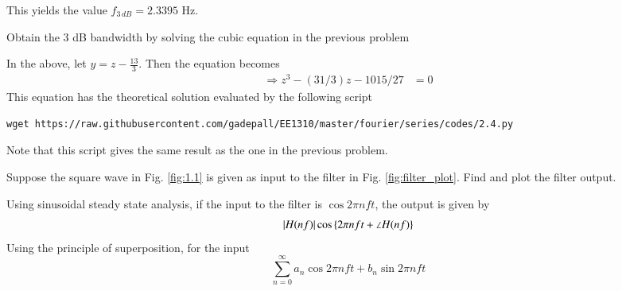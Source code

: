 \documentclass[journal,12pt,twocolumn]{IEEEtran}
\begin{document}
%
%
This yields the value $f_{3\, dB} = 2.3395$ Hz.
\begin{problem}
Obtain the 3 dB bandwidth by solving the cubic equation in the previous problem
\end{problem}
%
\solution In the above, let $y = z - \frac{13}{3}$.  Then the equation becomes
\begin{align}
\Rightarrow z^3 - (31/3)z  -1015/27  & = 0
\end{align}
This equation has the theoretical solution evaluated by the following script
%
\begin{lstlisting}
wget https://raw.githubusercontent.com/gadepall/EE1310/master/fourier/series/codes/2.4.py
\end{lstlisting}

%
Note that this script gives the same result as the one in the previous problem.
%
\begin{problem}
\label{filter_op}
Suppose the square wave in Fig. \ref{fig:1.1} is given as input to the filter in Fig. \ref{fig:filter_plot}.  Find and plot the filter output.
\end{problem}
%
\solution  Using sinusoidal steady state analysis, if the input to the filter is
%
$\cos{2\pi n f t}$, the output is given by
\begin{equation}
\left\vert H(nf)\right\vert\cos\left\{2\pi n f t + \angle H(nf)\right\}
\end{equation}
%
Using the principle of superposition, for the input 
%
\begin{equation}
\sum_{n=0}^{\infty}a_n\cos 2\pi n f t + b_n \sin 2 \pi n f t
\end{equation}
\end{document}
